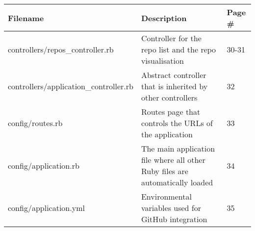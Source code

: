 \begin{center}
\begin{tabular}{ | m{16em} | m{18em}| m{4em} | } 
\hline
\textbf{Filename} & \textbf{Description} & \textbf{Page \#} \\ \hline
controllers/repos\_controller.rb & Controller for the repo list and the repo visualisation & 30-31 \\ \hline
controllers/application\_controller.rb & Abstract controller that is inherited by other controllers & 32 \\ \hline
config/routes.rb & Routes page that controls the URLs of the application & 33 \\ \hline  
config/application.rb & The main application file where all other Ruby files are automatically loaded & 34 \\ \hline
config/application.yml & Environmental variables used for GitHub integration & 35 \\ \hline
\end{tabular}
\end{center}

